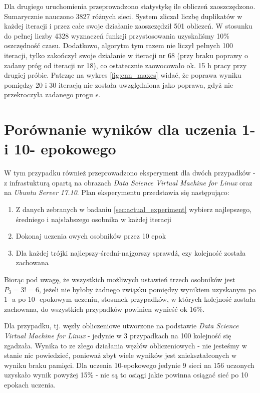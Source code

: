 Dla drugiego uruchomienia przeprowadzono statystykę ile obliczeń zaoszczędzono.
Sumarycznie nauczono 3827 różnych sieci.
System zliczał liczbę duplikatów w każdej iteracji i przez całe swoje działanie zaoszczędził 501 obliczeń.
W stosunku do pełnej liczby 4328 wyznaczeń funkcji przystosowania uzyskaliśmy 10\% oszczędność czasu.
Dodatkowo, algorytm tym razem nie liczył pełnych 100 iteracji, tylko zakończył swoje działanie w iteracji nr 68 (przy braku poprawy o zadany próg od iteracji nr 18), co ostatecznie zaowocowało ok. 15 h pracy przy drugiej próbie.
Patrząc na wykres \ref{fig:cnn_maxes} widać, że poprawa wyniku pomiędzy 20 i 30 iteracją nie została uwzględniona jako poprawa, gdyż nie przekroczyła zadanego progu $\epsilon$.

\section{Porównanie wyników dla uczenia 1- i 10- epokowego}\label{sec:thesis_proof}
W tym przypadku również przeprowadzono eksperyment dla dwóch przypadków - z infrastukturą opartą na obrazach \textit{Data Science Virtual Machine for Linux} oraz na \textit{Ubuntu Server 17.10}.
Plan eksperymentu przedstawia się następująco:
\begin{enumerate}
  \item Z danych zebranych w badaniu \ref{sec:actual_experiment} wybierz najlepszego, średniego i najsłabszego osobnika w każdej iteracji
  \item Dokonaj uczenia owych osobników przez 10 epok
  \item Dla każdej trójki najlepszy-średni-najgorszy sprawdź, czy kolejność została zachowana
\end{enumerate}

Biorąc pod uwagę, że wszystkich możliwych ustawień trzech osobników jest $P_3 = 3! = 6$, jeżeli nie byłoby żadnego związku pomiędzy wynikiem uzyskanym po 1- a po 10- epokowym uczeniu, stosunek przypadków, w których kolejność została zachowana, do wszystkich przypadków powinien wynieść ok 16\%.

Dla przypadku, tj. węzły obliczeniowe utworzone na podstawie \textit{Data Science Virtual Machine for Linux} - jedynie w 3 przypadkach na 100 kolejność się zgadzała. Wynika to ze złego działania węzłów obliczeniowych - nie jesteśmy w stanie nic powiedzieć, ponieważ zbyt wiele wyników jest zniekształconych w wyniku braku pamięci.
Dla uczenia 10-epokowego jedynie 9 sieci na 156 uczonych uzyskało wynik powyżej 15\% - nie są to osiągi jakie powinna osiągać sieć po 10 epokach uczenia.

